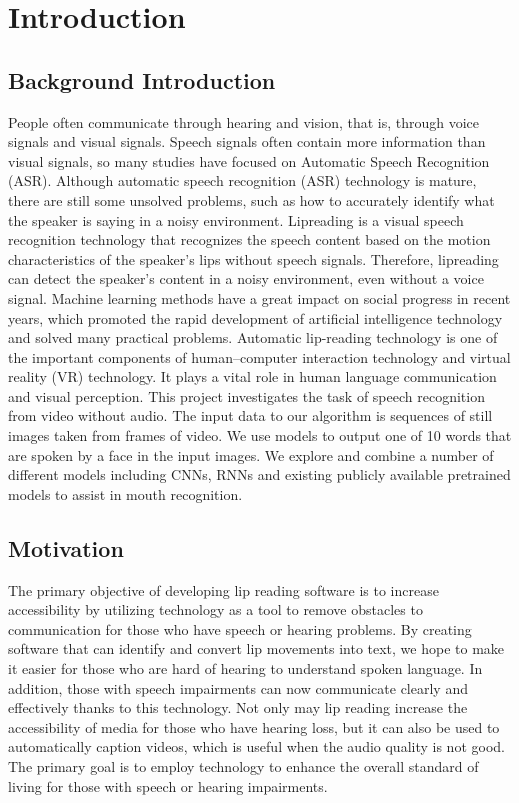      \chapter{Introduction}
        \section{Background Introduction}People often communicate through hearing and vision, that is, through voice signals and visual signals. Speech signals often contain more information than visual signals, so many studies have focused on Automatic Speech Recognition (ASR). Although automatic speech recognition (ASR) technology is mature, there are still some unsolved problems, such as how to accurately identify what the speaker is saying in a noisy environment. Lipreading is a visual speech recognition technology that recognizes the speech content based on the motion characteristics of the speaker’s lips without speech signals. Therefore, lipreading can detect the speaker’s content in a noisy environment, even without a voice signal.
Machine learning methods have a great impact on social progress in recent years, which promoted the rapid development of artificial intelligence technology and solved many practical problems. Automatic lip-reading technology is one of the important components of human–computer interaction technology and virtual reality (VR) technology. It plays a vital role in human language communication and visual perception. This project investigates the task of speech recognition from video without audio. The input data to our algorithm is sequences of still images taken from frames of video. We use models to output one of 10 words that are spoken by a face in the input images. We explore and combine a number of different models including CNNs, RNNs and existing publicly available pretrained models to assist in mouth recognition. 
        
       
        \section{Motivation}
        The primary objective of developing lip reading software is to increase accessibility by utilizing technology as a tool to remove obstacles to communication for those who have speech or hearing problems. By creating software that can identify and convert lip movements into text, we hope to make it easier for those who are hard of hearing to understand spoken language. In addition, those with speech impairments can now communicate clearly and effectively thanks to this technology. Not only may lip reading increase the accessibility of media for those who have hearing loss, but it can also be used to automatically caption videos, which is useful when the audio quality is not good. The primary goal is to employ technology to enhance the overall standard of living for those with speech or hearing impairments.
        
